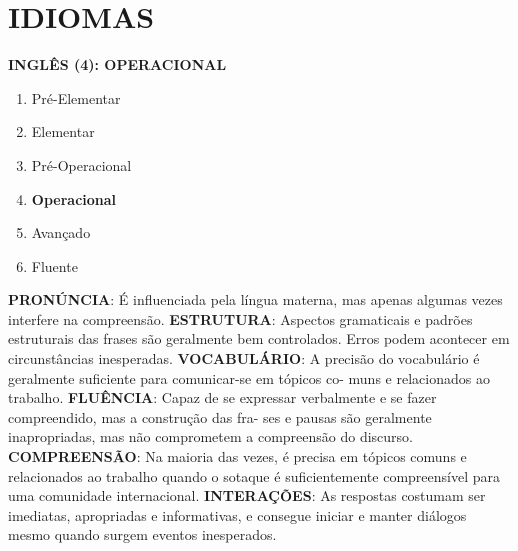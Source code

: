 \documentclass[10.5pt, a4paper]{report}
\begin{document}
\section{IDIOMAS}
\vspace{8pt}
\textbf{INGLÊS (4): OPERACIONAL}
\begin{enumerate}[leftmargin=32pt, topsep=16pt, itemsep=-2pt, align=left]
  \item Pré-Elementar
  \item Elementar
  \item Pré-Operacional
  \item \textbf{Operacional}
  \item Avançado
  \item Fluente
\end{enumerate}
\vspace{15pt}
\textbf{PRONÚNCIA}: É influenciada pela língua materna, mas apenas algumas vezes interfere na compreensão.
\newline\newline
\textbf{ESTRUTURA}: Aspectos gramaticais e padrões estruturais das frases são geralmente bem controlados. Erros podem acontecer em circunstâncias inesperadas.
\newline\newline
\textbf{VOCABULÁRIO}: A precisão do vocabulário é geralmente suficiente para comunicar-se em tópicos co- muns e relacionados ao trabalho.
\newline\newline
\textbf{FLUÊNCIA}: Capaz de se expressar verbalmente e se fazer compreendido, mas a construção das fra- ses e pausas são geralmente inapropriadas, mas não comprometem a compreensão do discurso.
\newline\newline
\textbf{COMPREENSÃO}: Na maioria das vezes, é precisa em tópicos comuns e relacionados ao trabalho quando o sotaque é suficientemente compreensível para uma comunidade internacional.
\newline\newline
\textbf{INTERAÇÕES}: As respostas costumam ser imediatas, apropriadas e informativas, e consegue iniciar e manter diálogos mesmo quando surgem eventos inesperados.
\vspace{25pt}
\newline\newline
\end{document}
